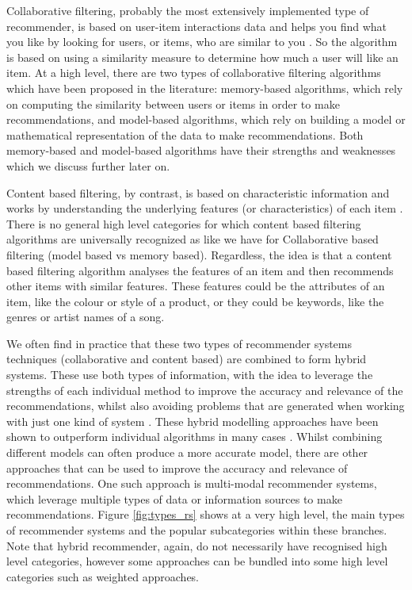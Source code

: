 Collaborative filtering, probably the most extensively implemented type of recommender, is based on user-item interactions data and helps you find what you like by looking for users, or items, who are similar to you \citep{thorat2015survey}. So the algorithm is based on using a similarity measure to determine how much a user will like an item. At a high level, there are two types of collaborative filtering algorithms which have been proposed in the literature: memory-based algorithms, which rely on computing the similarity between users or items in order to make recommendations, and model-based algorithms, which rely on building a model or mathematical representation of the data to make recommendations. Both memory-based and model-based algorithms have their strengths and weaknesses which we discuss further later on. 

Content based filtering, by contrast, is based on characteristic information and works by understanding the underlying features (or characteristics) of each item \citep{thorat2015survey}. There is no general high level categories for which content based filtering algorithms are universally recognized as like we have for Collaborative based filtering (model based vs memory based). Regardless, the idea is that a content based filtering algorithm analyses the features of an item and then recommends other items with similar features. These features could be the attributes of an item, like the colour or style  of a product, or they could be keywords, like the genres or artist names of a song. 

We often find in practice that these two types of recommender systems techniques (collaborative and content based) are combined to form hybrid systems. These use both types of information, with the idea to leverage the strengths of each individual method to improve the accuracy and relevance of the recommendations, whilst also avoiding problems that are generated when working with just one kind of system \citep{thorat2015survey}. These hybrid modelling approaches have been shown to outperform individual algorithms in many cases \citep{ccano2017hybrid}. Whilst combining different models can often produce a more accurate model, there are other approaches that can be used to improve the accuracy and relevance of recommendations. One such approach is multi-modal recommender systems, which leverage multiple types of data or information sources to make recommendations. Figure \ref{fig:types_rs} shows at a very high level, the main types of recommender systems and the popular subcategories within these branches. Note that hybrid recommender, again, do not necessarily have recognised high level categories, however some approaches can be bundled into some high level categories such as weighted approaches.


